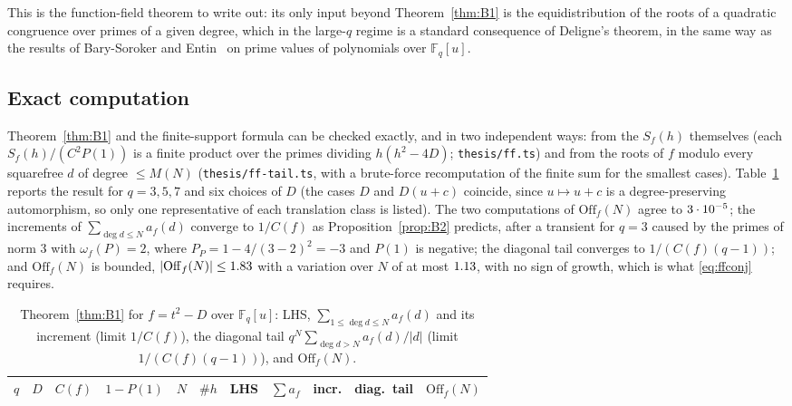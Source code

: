 \documentclass[11pt,a4paper]{article}
\newcommand{\F}{\mathbb{F}}
\begin{document}
This is the function-field theorem to write out: its only input beyond Theorem~\ref{thm:B1} is the
equidistribution of the roots of a quadratic congruence over primes of a given degree, which in the
large-$q$ regime is a standard consequence of Deligne's theorem, in the same way as the results of
Bary-Soroker and Entin~\cite{BarySoroker2012,Entin2016} on prime values of polynomials over $\F_q[u]$.

\subsection{Exact computation}

Theorem~\ref{thm:B1} and the finite-support formula can be checked exactly, and in two independent
ways: from the $S_f(h)$ themselves (each $S_f(h)/(C^2P(1))$ is a finite product over the primes dividing
$h(h^2-4D)$; \texttt{thesis/ff.ts}) and from the roots of $f$ modulo every squarefree $d$ of degree
$\le M(N)$ (\texttt{thesis/ff-tail.ts}, with a brute-force recomputation of the finite sum for the
smallest cases). Table~\ref{tab:ff} reports the result for $q=3,5,7$ and six choices of $D$ (the cases
$D$ and $D(u+c)$ coincide, since $u\mapsto u+c$ is a degree-preserving automorphism, so only one
representative of each translation class is listed). The two computations of $\mathrm{Off}_f(N)$ agree to
$3\cdot10^{-5}$; the increments of $\sum_{\deg d\le N}a_f(d)$ converge to $1/C(f)$ as
Proposition~\ref{prop:B2} predicts, after a transient for $q=3$ caused by the primes of norm $3$ with
$\omega_f(P)=2$, where $P_P=1-4/(3-2)^2=-3$ and $P(1)$ is negative; the diagonal tail converges to
$1/(C(f)(q-1))$; and $\mathrm{Off}_f(N)$ is bounded, $|\mathrm{Off}_f(N)|\le1.83$ with a variation
over $N$ of at most $1.13$, with no sign of growth, which is what \eqref{eq:ffconj} requires.

\begin{table}[h]
\centering\footnotesize\setlength{\tabcolsep}{4pt}
\caption{Theorem~\ref{thm:B1} for $f=t^2-D$ over $\F_q[u]$: LHS, $\sum_{1\le\deg d\le N}a_f(d)$ and its
increment (limit $1/C(f)$), the diagonal tail $q^N\sum_{\deg d>N}a_f(d)/|d|$ (limit $1/(C(f)(q-1))$),
and $\mathrm{Off}_f(N)$.}\label{tab:ff}
\begin{tabular}{rlrrrrrrrrr}
\toprule
$q$ & $D$ & $C(f)$ & $1-P(1)$ & $N$ & $\#h$ & LHS & $\sum a_f$ & incr. & diag.\ tail & $\mathrm{Off}_f(N)$\\
\midrule

\end{tabular}
\end{table}
\end{document}

